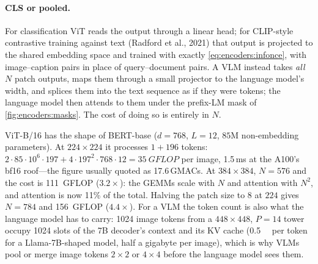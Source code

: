 \paragraph{CLS or pooled.} For classification ViT reads the \code{[CLS]} output through a linear
head; for CLIP-style contrastive training against text (Radford et al., 2021) that output is projected
to the shared embedding space and trained with exactly \cref{eq:encoders:infonce}, with image--caption
pairs in place of query--document pairs. A VLM instead takes \emph{all} $N$ patch outputs, maps them
through a small projector to the language model's width, and splices them into the text sequence as
if they were tokens; the language model then attends to them under the prefix-LM mask of
\cref{fig:encoders:masks}. The cost of doing so is entirely in $N$.

\begin{napkinmath}
ViT-B/16 has the shape of BERT-base ($d=768$, $L=12$, $85$M non-embedding parameters). At
$224\times224$ it processes $1+196$ tokens: $2\cdot85\cdot10^6\cdot197+4\cdot197^2\cdot768\cdot12=\SI{35}{GFLOP}$
per image, 1.5\,ms at the A100's bf16 roof---the figure usually quoted as 17.6\,GMACs. At $384\times384$,
$N=576$ and the cost is \SI{111}{GFLOP} ($3.2\times$): the GEMMs scale with $N$ and attention
with $N^2$, and attention is now 11\% of the total. Halving the patch size to 8 at $224$ gives
$N=784$ and \SI{156}{GFLOP} ($4.4\times$). For a VLM the token count is also what the language
model has to carry: 1024 image tokens from a $448\times448$, $P=14$ tower occupy 1024 slots of the
7B decoder's context and its KV cache (\SI{0.5}{\mega\byte} per token for a Llama-7B-shaped model,
half a gigabyte per image), which is why VLMs pool or merge image tokens $2\times2$ or $4\times4$
before the language model sees them.
\end{napkinmath}
